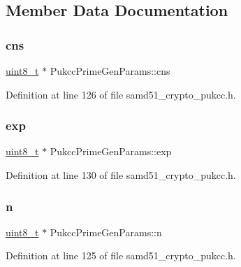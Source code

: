 \subsection{Member Data Documentation}
\mbox{\label{structPukccPrimeGenParams_ae8068e2fe9ab90e9d1088bc3eb6ffdfb}} 
\subsubsection{\texorpdfstring{cns}{cns}}
{\footnotesize\ttfamily \hyperlink{stdint_8h_aba7bc1797add20fe3efdf37ced1182c5}{uint8\+\_\+t} $\ast$ Pukcc\+Prime\+Gen\+Params\+::cns}



Definition at line 126 of file samd51\+\_\+crypto\+\_\+pukcc.\+h.

\mbox{\label{structPukccPrimeGenParams_a6bf437cdac813745c5fd5414238bd761}} 
\subsubsection{\texorpdfstring{exp}{exp}}
{\footnotesize\ttfamily \hyperlink{stdint_8h_aba7bc1797add20fe3efdf37ced1182c5}{uint8\+\_\+t} $\ast$ Pukcc\+Prime\+Gen\+Params\+::exp}



Definition at line 130 of file samd51\+\_\+crypto\+\_\+pukcc.\+h.

\mbox{\label{structPukccPrimeGenParams_ac685ee671de74cb9c6cd1275060ab60d}} 
\subsubsection{\texorpdfstring{n}{n}}
{\footnotesize\ttfamily \hyperlink{stdint_8h_aba7bc1797add20fe3efdf37ced1182c5}{uint8\+\_\+t} $\ast$ Pukcc\+Prime\+Gen\+Params\+::n}



Definition at line 125 of file samd51\+\_\+crypto\+\_\+pukcc.\+h.

